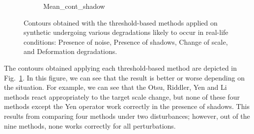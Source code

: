 \begin{figure}[htbp]
\begin{subfigure}[t]{0.15\textwidth}
{    {Mean_cont_shadow}}
    \caption{} 
\end{subfigure}\qquad
\begin{subfigure}[t]{0.15\textwidth}
    \caption{} 
\end{subfigure}\qquad
\begin{subfigure}[t]{0.15\textwidth}
    \caption{}  
\end{subfigure}
\caption{Contours obtained with the threshold-based methods applied on synthetic undergoing various degradations likely to occur in real-life conditions:  Presence of noise,  Presence of shadows,  Change of scale, and  Deformation degradations.}\label{fig:thr_synth_comparison}
\end{figure}

The contours obtained applying each threshold-based method are depicted in Fig.\ \ref{fig:thr_synth_comparison}. In this figure, we can see that the result is better or worse depending on the situation. For example, we can see that the Otsu, Riddler, Yen and Li methods react appropriately to the target scale change, but none of these four methods except the Yen operator work correctly in the presence of shadows. This results from comparing four methods under two disturbances; however, out of the nine methods, none works correctly for all perturbations.

